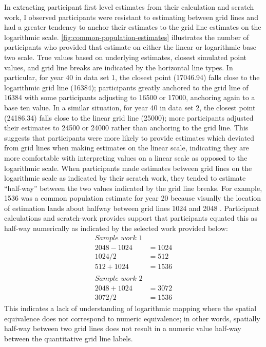 \documentclass[print]{nuthesis}
\begin{document}
In extracting participant first level estimates from their calculation and scratch work, I observed participants were resistant to estimating between grid lines and had a greater tendency to anchor their estimates to the grid line estimates on the logarithmic scale.
\cref{fig:common-population-estimates} illustrates the number of participants who provided that estimate on either the linear or logarithmic base two scale.
True values based on underlying estimates, closest simulated point values, and grid line breaks are indicated by the horizontal line types.
In particular, for year 40 in data set 1, the closest point (17046.94) falls close to the logarithmic grid line (16384); participants greatly anchored to the grid line of 16384 with some participants adjusting to 16500 or 17000, anchoring again to a base ten value.
In a similar situation, for year 40 in data set 2, the closest point (24186.34) falls close to the linear grid line (25000); more participants adjusted their estimates to 24500 or 24000 rather than anchoring to the grid line.
This suggests that participants were more likely to provide estimates which deviated from grid lines when making estimates on the linear scale, indicating they are more comfortable with interpreting values on a linear scale as opposed to the logarithmic scale.
When participants made estimates between grid lines on the logarithmic scale as indicated by their scratch work, they tended to estimate ``half-way'' between the two values indicated by the grid line breaks.
For example, 1536 was a common population estimate for year 20 because visually the location of estimation lands about halfway between grid lines 1024 and 2048 .
Participant calculations and scratch-work provides support that participants equated this as half-way numerically as indicated by the selected work provided below:
\begin{align}
\textit{Sample work 1} \nonumber\\
2048-1024 &= 1024 \nonumber \\
1024/2 &= 512 \nonumber\\
512+1024 &= 1536 \nonumber
\nonumber \\ 
\nonumber \\
\textit{Sample work 2} \nonumber\\
2048 + 1024 & =3072 \nonumber\\
3072/2 & =1536 \nonumber
\end{align}
This indicates a lack of understanding of logarithmic mapping where the spatial equivalence does not correspond to numeric equivalence; in other words, spatially half-way between two grid lines does not result in a numeric value half-way between the quantitative grid line labels.
\end{document}
